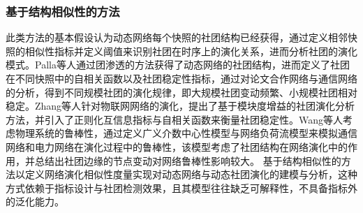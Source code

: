 \begin{table}[htbp]
	\caption{社团演化分析方法分类对比简表}
	\vspace{0.5em}\centering\wuhao
	\label{chap1:tab:ievolution}
\end{table}
\subsubsection{基于结构相似性的方法}
此类方法的基本假设认为动态网络每个快照的社团结构已经获得，通过定义相邻快照的相似性指标并定义阈值来识别社团在时序上的演化关系，进而分析社团的演化模式。Palla等人\cite{palla2007quantifying}通过团渗透的方法获得了动态网络的社团结构，进而定义了社团在不同快照中的自相关函数以及社团稳定性指标，通过对论文合作网络与通信网络的分析，得到不同规模社团的演化规律，即大规模社团变动频繁、小规模社团相对稳定。Zhang等人\cite{zhong2014evolution}针对物联网网络的演化，提出了基于模块度增益的社团演化分析方法，并引入了正则化互信息指标与自相关函数来衡量社团稳定性。Wang等人\cite{wang2024community}考虑物理系统的鲁棒性，通过定义广义介数中心性模型与网络负荷流模型来模拟通信网络和电力网络在演化过程中的鲁棒性，该模型考虑了社团结构在网络演化中的作用，并总结出社团边缘的节点变动对网络鲁棒性影响较大。
基于结构相似性的方法以定义网络演化相似性度量实现对动态网络与动态社团演化的建模与分析，这种方式依赖于指标设计与社团检测效果，且其模型往往缺乏可解释性，不具备指标外的泛化能力。

